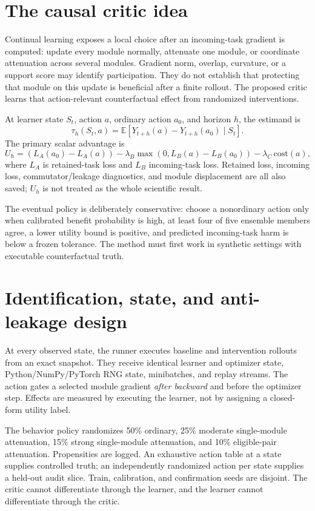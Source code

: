 \documentclass[11pt]{article}
\begin{document}
\section{The causal critic idea}
Continual learning exposes a local choice after an incoming-task gradient is computed: update every module normally, attenuate one module, or coordinate attenuation across several modules. Gradient norm, overlap, curvature, or a support score may identify participation. They do not establish that protecting that module on this update is beneficial after a finite rollout. The proposed critic learns that action-relevant counterfactual effect from randomized interventions.

At learner state $S_t$, action $a$, ordinary action $a_0$, and horizon $h$, the estimand is
\[
 \tau_h(S_t,a)=\mathbb{E}[Y_{t+h}(a)-Y_{t+h}(a_0)\mid S_t].
\]
The primary scalar advantage is
\[
 U_h=(L_A(a_0)-L_A(a))
 -\lambda_B\max(0,L_B(a)-L_B(a_0))
 -\lambda_C\,\mathrm{cost}(a),
\]
where $L_A$ is retained-task loss and $L_B$ incoming-task loss. Retained loss, incoming loss, commutator/leakage diagnostics, and module displacement are all also saved; $U_h$ is not treated as the whole scientific result.

The eventual policy is deliberately conservative: choose a nonordinary action only when calibrated benefit probability is high, at least four of five ensemble members agree, a lower utility bound is positive, and predicted incoming-task harm is below a frozen tolerance. The method must first work in synthetic settings with executable counterfactual truth.

\section{Identification, state, and anti-leakage design}
At every observed state, the runner executes baseline and intervention rollouts from an exact snapshot. They receive identical learner and optimizer state, Python/NumPy/PyTorch RNG state, minibatches, and replay streams. The action gates a selected module gradient \emph{after backward} and before the optimizer step. Effects are measured by executing the learner, not by assigning a closed-form utility label.

The behavior policy randomizes 50\% ordinary, 25\% moderate single-module attenuation, 15\% strong single-module attenuation, and 10\% eligible-pair attenuation. Propensities are logged. An exhaustive action table at a state supplies controlled truth; an independently randomized action per state supplies a held-out audit slice. Train, calibration, and confirmation seeds are disjoint. The critic cannot differentiate through the learner, and the learner cannot differentiate through the critic.
\end{document}
